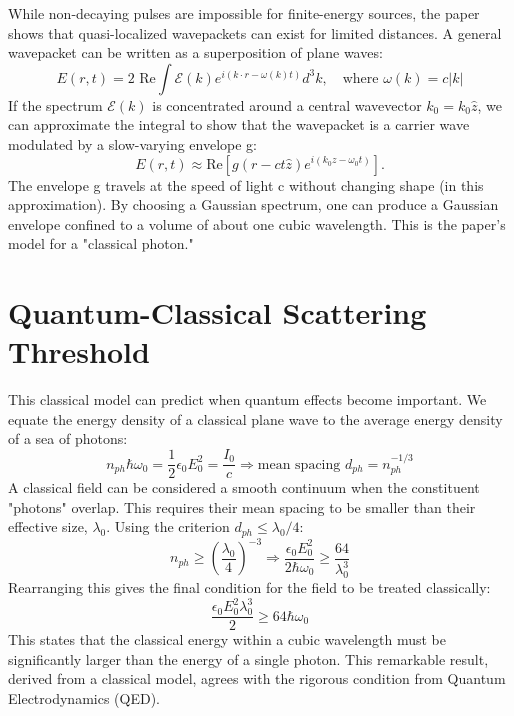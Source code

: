 \documentclass[11pt,a4paper]{article}
\begin{document}
While non-decaying pulses are impossible for finite-energy sources, the paper shows that quasi-localized wavepackets can exist for limited distances. A general wavepacket can be written as a superposition of plane waves:
\begin{equation}
    E(r,t)=2 \text{ Re}\int\mathcal{E}(k)e^{i(k\cdot r-\omega(k)t)}d^{3}k, \quad \text{where } \omega(k)=c|k|
\end{equation}
If the spectrum \(\mathcal{E}(k)\) is concentrated around a central wavevector \(k_{0}=k_{0}\hat{z}\), we can approximate the integral to show that the wavepacket is a carrier wave modulated by a slow-varying envelope g:
\begin{equation}
    E(r,t)\approx \text{Re}[g(r-c t\hat{z})e^{i(k_{0}z-\omega_{0}t)}].
\end{equation}
The envelope g travels at the speed of light c without changing shape (in this approximation). By choosing a Gaussian spectrum, one can produce a Gaussian envelope confined to a volume of about one cubic wavelength. This is the paper's model for a "classical photon."

\section{Quantum-Classical Scattering Threshold}

This classical model can predict when quantum effects become important. We equate the energy density of a classical plane wave to the average energy density of a sea of photons:
\begin{equation}
    n_{ph}\hbar\omega_{0}=\frac{1}{2}\epsilon_{0}E_{0}^{2}=\frac{I_{0}}{c} \Rightarrow \text{mean spacing } d_{ph}=n_{ph}^{-1/3}
\end{equation}
A classical field can be considered a smooth continuum when the constituent "photons" overlap. This requires their mean spacing to be smaller than their effective size, \(\lambda_{0}\). Using the criterion \(d_{ph}\le\lambda_{0}/4\):
\begin{equation}
    n_{ph}\ge\left(\frac{\lambda_{0}}{4}\right)^{-3} \Rightarrow \frac{\epsilon_{0}E_{0}^{2}}{2\hbar\omega_{0}}\ge\frac{64}{\lambda_{0}^{3}}
\end{equation}
Rearranging this gives the final condition for the field to be treated classically:
\begin{equation}
    \frac{\epsilon_{0}E_{0}^{2}\lambda_{0}^{3}}{2}\ge64\hbar\omega_{0}
\end{equation}
This states that the classical energy within a cubic wavelength must be significantly larger than the energy of a single photon. This remarkable result, derived from a classical model, agrees with the rigorous condition from Quantum Electrodynamics (QED).
\end{document}
